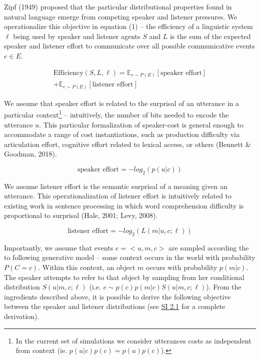 \documentclass[10pt, letterpaper]{article}
\begin{document}
Zipf (1949) proposed that the particular distributional properties found
in natural language emerge from competing speaker and listener
pressures. We operationalize this objective in equation (1) -- the
efficiency of a linguistic system \(\ell\) being used by speaker and
listener agents \(S\) and \(L\) is the sum of the expected speaker and
listener effort to communicate over all possible communicative events
\(e \in E\).\par

\begin{equation}
\begin{split}
  \text{Efficiency}(S, L, \ell) = \mathbb{E}_{e \sim P(E)}[\text{speaker effort}] \\+ \mathbb{E}_{e \sim P(E)}[\text{listener effort}]
\end{split}
\end{equation}

We assume that speaker effort is related to the surprisal of an
utterance in a particular
context\footnote{In the current set of simulations we consider utterances costs as independent from context (ie. $p(u|c)p(c)=p(u)p(c)$).}
-- intuitively, the number of bits needed to encode the utterance \(u\).
This particular formalization of speaker-cost is general enough to
accommodate a range of cost instantiations, such as production
difficulty via articulation effort, cognitive effort related to lexical
access, or others (Bennett \& Goodman, 2018).\par

\[\text{speaker effort} = -log_2(p(u|c))\]

We assume listener effort is the semantic surprisal of a meaning given
an utterance. This operationalization of listener effort is intuitively
related to existing work in sentence processing in which word
comprehension difficulty is proportional to surprisal (Hale, 2001; Levy,
2008).

\[\text{listener effort} = -log_2(L(m|u, c; \ell))\]

Importantly, we assume that events \(e = <u, m, c>\) are sampled
according the to following generative model -- some context occurs in
the world with probability \(P(C=c)\). Within this context, an object
\(m\) occurs with probability \(p(m|c)\). The speaker attempts to refer
to that object by sampling from her conditional distribution
\(S(u|m, c; \ell)\) (i.e. \(e \sim p(c)p(m|c)S(u|m, c; \ell)\)). From
the ingredients described above, it is possible to derive the following
objective between the speaker and listener distributions (see
\href{https://github.com/benpeloquin7/zipf_principles/blob/master/paper/supplementary_materials.pdf}{SI 2.1}
for a complete derivation).
\end{document}
